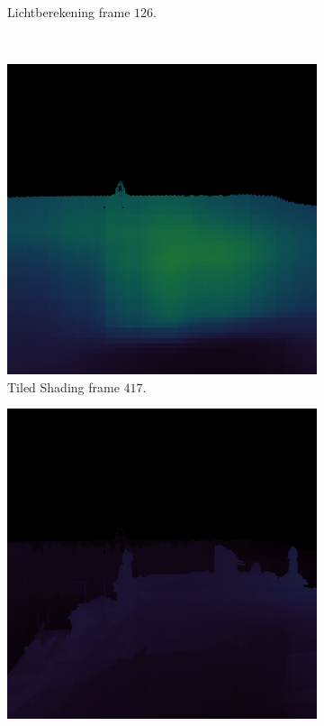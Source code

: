 \begin{figure}[t]
\begin{subfigure}[b]{0.35\textwidth}
    \caption{Lichtberekening frame $126$.}
    \vspace{2pt}
    \label{fig:cs-test-frames-example:pa:126cs}
  \end{subfigure}\\
  \begin{subfigure}[b]{0.35\textwidth}
    \includegraphics[width=\textwidth]{./img/raw/lc-frame-example/ts/zc_frame_417.png}
    \caption{Tiled Shading frame $417$.}
    \label{fig:cs-test-frames-example:zc:417ts}
  \end{subfigure}\quad %
  \begin{subfigure}[b]{0.35\textwidth}
    \includegraphics[width=\textwidth]{./img/raw/lc-frame-example/cs/zc_frame_417.png}

\end{subfigure}
\end{figure}
